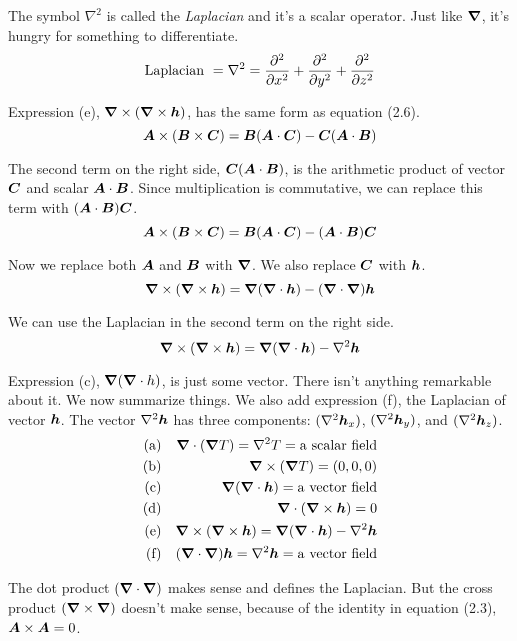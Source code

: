 The symbol $\nabla^2$ is called the \emph{Laplacian} and it's a scalar operator.
Just like $\boldsymbol{\nabla}$, it's hungry for something to differentiate.
\begin{equation}
  \mathrm{Laplacian\ } = \nabla^2 = \frac{\partial ^2}{\partial x^2} + \frac{\partial ^2}{\partial y^2} + \frac{\partial ^2}{\partial z^2}
\end{equation}

Expression (e), $\boldsymbol{\nabla} \times (\boldsymbol{\nabla} \times \boldsymbol{h})$, has the same form as equation (2.6).
\begin{equation}
  \boldsymbol{A} \times (\boldsymbol{B} \times \boldsymbol{C})
  = \boldsymbol{B} (\boldsymbol{A} \cdot \boldsymbol{C}) - \boldsymbol{C}(\boldsymbol{A} \cdot \boldsymbol{B})
\end{equation}

The second term on the right side, $\boldsymbol{C}(\boldsymbol{A} \cdot \boldsymbol{B})$,
is the arithmetic product of vector $\boldsymbol{C}$ and scalar $\boldsymbol{A} \cdot \boldsymbol{B}$.
Since multiplication is commutative, we can replace this term
with $(\boldsymbol{A} \cdot \boldsymbol{B}) \boldsymbol{C}$.
\begin{equation}
  \boldsymbol{A} \times (\boldsymbol{B} \times \boldsymbol{C})
  = \boldsymbol{B} (\boldsymbol{A} \cdot \boldsymbol{C}) - (\boldsymbol{A} \cdot \boldsymbol{B}) \boldsymbol{C}
\end{equation}

Now we replace both $\boldsymbol{A}$ and $\boldsymbol{B}$ with $\boldsymbol{\nabla}$.
We also replace $\boldsymbol{C}$ with $\boldsymbol{h}$.
\begin{equation}
  \boldsymbol{\nabla} \times (\boldsymbol{\nabla} \times \boldsymbol{h})
  = \boldsymbol{\nabla} (\boldsymbol{\nabla} \cdot \boldsymbol{h}) - (\boldsymbol{\nabla} \cdot \boldsymbol{\nabla}) \boldsymbol{h}
\end{equation}

We can use the Laplacian in the second term on the right side.
\begin{equation}
  \boldsymbol{\nabla} \times (\boldsymbol{\nabla} \times \boldsymbol{h})
  = \boldsymbol{\nabla} (\boldsymbol{\nabla} \cdot \boldsymbol{h}) - \nabla^2 \boldsymbol{h}
\end{equation}

Expression (c), $\boldsymbol{\nabla} (\boldsymbol{\nabla} \cdot h)$, is just some vector.
There isn't anything remarkable about it.
We now summarize things.
We also add expression (f), the Laplacian of vector $\boldsymbol{h}$.
The vector $\nabla^2 \boldsymbol{h}$ has three components: $(\nabla^2 \boldsymbol{h}_x)$,
$(\nabla^2 \boldsymbol{h}_y)$, and $(\nabla^2 \boldsymbol{h}_z)$.
\begin{eqnarray}
  \mathrm{(a)} & & \grad \cdot (\grad T) = \nabla^2 T = \mathrm{a\ scalar\ field} \nonumber\\
  \mathrm{(b)} & & \grad \times (\grad T) = (0,0,0) \nonumber\\
  \mathrm{(c)} & & \grad (\grad \cdot \bv{h}) = \mathrm{a\ vector\ field} \nonumber\\
  \mathrm{(d)} & & \grad \cdot (\grad \times \bv{h}) = 0 \\
  \mathrm{(e)} & & \grad \times (\grad \times \bv{h}) = 
               \grad (\grad \cdot \bv{h}) - \nabla^2 \bv{h} \nonumber\\
  \mathrm{(f)} & & (\grad \cdot \grad)\bv{h} =
               \nabla^2 \bv{h} = \mathrm{a\ vector\ field} \nonumber
\end{eqnarray}

The dot product $(\boldsymbol{\nabla} \cdot \boldsymbol{\nabla})$ makes sense and defines the Laplacian.
But the cross product $(\boldsymbol{\nabla} \times \boldsymbol{\nabla})$ doesn't make sense,
because of the identity in equation (2.3), $\boldsymbol{A} \times \boldsymbol{A} = 0$.

